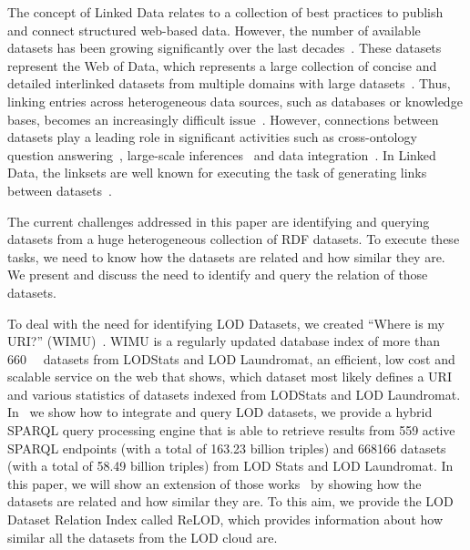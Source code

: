 \documentclass[sw]{iosart2x}
\begin{document}

The concept of Linked Data relates to a collection of best practices to publish and connect structured web-based data.
However, the number of available datasets has been growing significantly over the last decades~\cite{bizer2011linked}.
These datasets represent the Web of Data, which represents a large collection of concise and detailed interlinked datasets from multiple domains with large datasets~\cite{saleem2013linked}.
Thus, linking entries across heterogeneous data sources, such as databases or knowledge bases, becomes an increasingly difficult issue~\cite{valdestilhas2017high, NGAU11, saeedi2018scalable}.
However, connections between datasets play a leading role in significant activities such as cross-ontology question answering~\cite{lopez2009cross}, large-scale inferences~\cite{urbani2010owl} and data integration~\cite{rahm2016case}.
In Linked Data, the linksets are well known for executing the task of generating links between datasets~\cite{NGAU11}.

The current challenges addressed in this paper are identifying and querying datasets from a huge heterogeneous collection of RDF datasets.
To execute these tasks, we need to know how the datasets are related and how similar they are.
We present and discuss the need to identify and query the relation of those datasets.

To deal with the need for identifying LOD Datasets, we created \enquote{Where is my URI?} (WIMU)~\cite{valdestilhas2018my}.
WIMU is a regularly updated database index of more than \SI{660}{\kilo\nothing} datasets from LODStats and LOD Laundromat, an efficient, low cost and scalable service on the web that shows, which dataset most likely defines a URI and various statistics of datasets indexed from LODStats and LOD Laundromat.
In~\cite{valdestilhas2019more} we show how to integrate and query LOD datasets, we provide a hybrid SPARQL query processing engine that is able to retrieve results from 559 active SPARQL endpoints (with a total of \num{163.23} billion triples) and \num{668166} datasets (with a total of \num{58.49} billion triples) from LOD Stats and LOD Laundromat.
In this paper, we will show an extension of those works~\cite{valdestilhas2018my, valdestilhas2019more} by showing how the datasets are related and how similar they are.
To this aim, we provide the LOD Dataset Relation Index called ReLOD, which provides information about how similar all the datasets from the LOD cloud are.%
\end{document}
